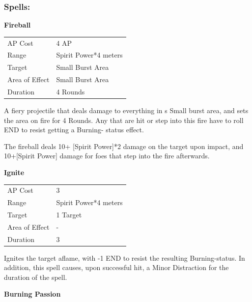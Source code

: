 \documentclass[11pt,a4paper,twocolumn]{book}
\begin{document}
\vfill

\subsubsection*{Spells:}


\smallskip
\noindent
\textbf{Fireball}

\smallskip
{
	\begin{tabu} to 70mm{| X[l,4] | X[l,7] |}
		\hline
        AP Cost	      	& 4 AP 					\\
        Range     		& Spirit Power*4 meters	\\
        Target      	& Small Burst Area		\\
        Area of Effect  & Small Burst Area  	 \\
        Duration     	& 4 Rounds				\\ \hline
	\end{tabu}
		
}

\medskip

A fiery projectile that deals damage to everything in s Small burst area, and sets the area on fire for 4 Rounds. Any that are hit or step into this fire have to roll END to resist getting a Burning- status effect.

The fireball deals 10+ [Spirit Power]*2 damage on the target upon impact, and 10+[Spirit Power] damage for foes that step into the fire afterwards. 

\bigskip
\noindent
\textbf{Ignite}

\smallskip
{
	\begin{tabu} to 70mm{| X[l,4] | X[l,7] |}
		\hline
        AP Cost	      	& 3 					\\
        Range     		& Spirit Power*4 meters	\\
        Target      	& 1 Target				\\
        Area of Effect  & -  	 				\\
        Duration     	& 3				\\ \hline
	\end{tabu}
		
}

\medskip

Ignites the target aflame, with -1 END to resist the resulting Burning-status. In addition, this spell causes, upon successful hit, a Minor Distraction for the duration of the spell.

\bigskip
\noindent
\textbf{Burning Passion}
\end{document}
